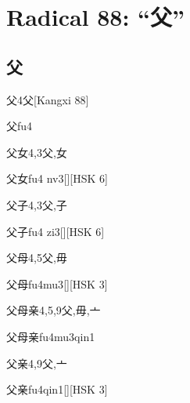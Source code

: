 \section*{Radical 88: ``⽗''}

\subsection*{父}

\begin{Entry}{父}{4}{⽗}[Kangxi 88]
  \begin{Phonetics}{父}{fu4}
  \end{Phonetics}
\end{Entry}

\begin{Entry}{父女}{4,3}{⽗,⼥}
  \begin{Phonetics}{父女}{fu4 nv3}[][HSK 6]
  \end{Phonetics}
\end{Entry}

\begin{Entry}{父子}{4,3}{⽗,⼦}
  \begin{Phonetics}{父子}{fu4 zi3}[][HSK 6]
  \end{Phonetics}
\end{Entry}

\begin{Entry}{父母}{4,5}{⽗,⽏}
  \begin{Phonetics}{父母}{fu4mu3}[][HSK 3]
  \end{Phonetics}
\end{Entry}

\begin{Entry}{父母亲}{4,5,9}{⽗,⽏,⼇}
  \begin{Phonetics}{父母亲}{fu4mu3qin1}
  \end{Phonetics}
\end{Entry}

\begin{Entry}{父亲}{4,9}{⽗,⼇}
  \begin{Phonetics}{父亲}{fu4qin1}[][HSK 3]
  \end{Phonetics}
\end{Entry}

